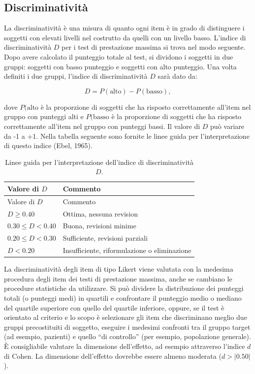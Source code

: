\documentclass[
  11pt,
]{krantz}
\theoremstyle{definition}
\theoremstyle{definition}
\theoremstyle{definition}
\theoremstyle{definition}
\theoremstyle{remark}
\begin{document}
\hypertarget{discriminativituxe0}{%
\subsection{Discriminatività}\label{discriminativituxe0}}

La discriminatività è una misura di quanto ogni item è in grado di distinguere i soggetti con elevati livelli nel costrutto da quelli con un livello basso. L'indice di discriminatività \(D\) per i test di prestazione massima si trova nel modo seguente. Dopo avere calcolato il punteggio totale al test, si dividono i soggetti in due gruppi: soggetti con basso punteggio e soggetti con alto punteggio. Una volta definiti i due gruppi, l'indice di discriminatività \(D\) sarà dato da:

\[D = P(\text{alto}) - P(\text{basso}),\]

dove \(P(\text{alto}\) è la proporzione di soggetti che ha risposto correttamente all'item nel gruppo con punteggi alti e \(P(\text{basso}\) è la proporzione di soggetti che ha risposto correttamente all'item nel gruppo con punteggi bassi. Il valore di \(D\) può variare da -1 a +1. Nella tabella seguente sono fornite le linee guida per l'interpretazione di questo indice (Ebel, 1965).

\hypertarget{tab:ebel_1965}{}
\begin{longtable}[]{@{}ll@{}}
\caption{Linee guida per l'interpretazione dell'indice di discriminatività \(D\).}\tabularnewline
\toprule
Valore di \(D\) & Commento \\
\midrule
\endfirsthead
\toprule
Valore di \(D\) & Commento \\
\midrule
\endhead
\(D \geq 0.40\) & Ottima, nessuna revision \\
\(0.30 \leq D < 0.40\) & Buona, revisioni minime \\
\(0.20 \leq D < 0.30\) & Sufficiente, revisioni parziali \\
\(D < 0.20\) & Insufficiente, riformulazione o eliminazione \\
\bottomrule
\end{longtable}

\protect\hypertarget{tab:ebel_1965}{}{}

La discriminatività degli item di tipo Likert viene valutata con la medesima procedura degli item dei testi di prestazione massima, anche se cambiano le procedure statistiche da utilizzare. Si può dividere la distribuzione dei punteggi totali (o punteggi medi) in quartili e confrontare il punteggio medio o mediano del quartile superiore con quello del quartile inferiore, oppure, se il test è orientato al criterio e lo scopo è selezionare gli item che discriminano meglio due gruppi precostituiti di soggetto, eseguire i medesimi confronti tra il gruppo target (ad esempio, pazienti) e quello ``di controllo'' (per esempio, popolazione generale). È consigliabile valutare la dimensione dell'effetto, ad esempio attraverso l'indice \(d\) di Cohen. La dimensione dell'effetto dovrebbe essere almeno moderata (\(d > |0.50|\)).
\end{document}
